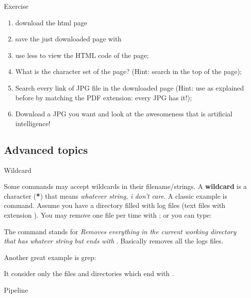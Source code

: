 \begin{frame}{Exercise}
	\begin{enumerate}
		\item<1-> download the html page 
		\item<2-> save the just downloaded page with 
		\item<3-> use less to view the HTML code of the page;
		\item<4-> What is the character set of the page? (Hint: search  in the top of the page);
		\item<5-> Search every link of JPG file in the downloaded page (Hint: use  as explained before by matching the PDF extension: every JPG has it!);
		\item<6-> Download a JPG you want and look at the awesomeness that is artificial intelligence!
	\end{enumerate}
\end{frame}

\subsection{Advanced topics}

\begin{frame}{Wildcard}

Some commands may accept wildcards in their filename/strings. A \textbf{wildcard} is a character (\textbf{*}) that means  \textit{whatever string, i don't care}. A classic example is  command. Assume you have a directory filled with log files (text files with extension ). You may remove one file per time with ; or you can type:

\begin{center}
\end{center}

The command stands for \textit{Removes everything in the current working directory that has whatevr string but ends with }. Basically removes all the logs files.

Another great example is grep:

\begin{center}
\end{center}

It consider only the files and directories which end with .

\end{frame}

\begin{frame}{Pipeline}

\end{frame}